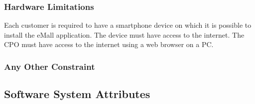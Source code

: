\subsubsection{Hardware Limitations}

Each customer is required to have a smartphone device on which it is possible to install the eMall application. The device must have access to the internet. \newline
The CPO must have access to the internet using a web browser on a PC.  

\subsubsection{Any Other Constraint}

\subsection{Software System Attributes}

